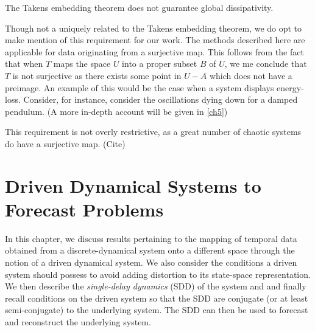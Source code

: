 \documentclass[a4paper,12pt,twoside]{report}
\begin{document}
The Takens embedding theorem does not guarantee global dissipativity.



Though not a uniquely related to the Takens embedding theorem, we do opt to make mention of this requirement for our work. 
The methods described here are applicable for data originating from a surjective map. 
This follows from the fact that when $T$ maps the space $U$ into a proper subset $B$ of $U$, we me conclude that $T$ is not surjective as there exists some point in $U-A$ which does not have a preimage.
An example of this would be the case when a system displays energy-loss. Consider, for instance, consider the oscillations dying down for a damped pendulum. (A more in-depth account will be given in \ref{ch5})

This requirement is not overly restrictive, as a great number of chaotic systems do have a surjective map. (Cite) 


\chapter{Driven Dynamical Systems to Forecast Problems}\label{ch4}

In this chapter, we discuss results pertaining to the mapping of temporal data obtained from a discrete-dynamical system onto a different space through the notion of a driven dynamical system. 
We also consider the conditions a driven system should possess to avoid adding distortion to its state-space representation. We then describe the \emph{single-delay dynamics} (SDD) of the system and and finally recall conditions on the driven system so that the SDD are conjugate (or at least semi-conjugate) to the underlying system. 
The SDD can then be used to forecast and reconstruct the underlying system. 
\end{document}
